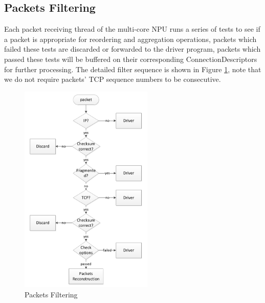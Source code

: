 \documentclass[conference]{IEEEtran}
\begin{document}
\subsection{Packets Filtering}
Each packet receiving thread of the multi-core NPU runs a series of tests to see if a packet is appropriate for reordering and aggregation operations, packets which failed these tests are discarded or forwarded to the driver program, packets which passed these tests will be buffered on their corresponding ConnectionDescriptors for further processing. The detailed filter sequence is shown in Figure \ref{packets filtering}, note that we do not require packets' TCP sequence numbers to be consecutive.
\begin{figure}[!t]
\centering
\includegraphics[width=2.5in]{filter_packets}
\caption{Packets Filtering}
\label{packets filtering}
\end{figure}
\end{document}

